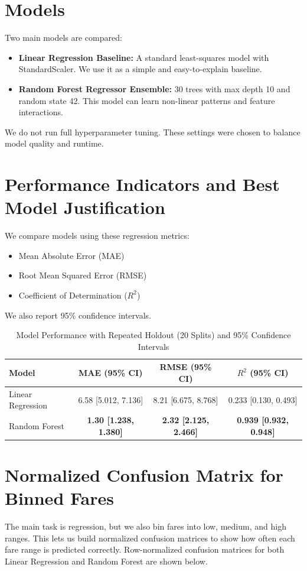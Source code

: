 \documentclass[conference]{IEEEtran}
\begin{document}
\section{Models}
Two main models are compared:
\begin{itemize}
\item \textbf{Linear Regression Baseline:} A standard least-squares model with StandardScaler.
          We use it as a simple and easy-to-explain baseline.
\item \textbf{Random Forest Regressor Ensemble:} 30 trees with max depth 10 and random state 42.
		  This model can learn non-linear patterns and feature interactions.
\end{itemize}
We do not run full hyperparameter tuning.
These settings were chosen to balance model quality and runtime.

\section{Performance Indicators and Best Model Justification}
We compare models using these regression metrics:
\begin{itemize}
	\item Mean Absolute Error (MAE)
	\item Root Mean Squared Error (RMSE)
	\item Coefficient of Determination ($R^2$)
\end{itemize}
We also report 95\% confidence intervals.

\begin{table}[htbp]
\caption{Model Performance with Repeated Holdout (20 Splits) and 95\% Confidence Intervals}
\label{tab:results}
\centering
\begin{tabular}{lccc}
\toprule
Model & MAE (95\% CI) & RMSE (95\% CI) & $R^2$ (95\% CI) \\
\midrule
Linear Regression & 6.58 [5.012, 7.136] & 8.21 [6.675, 8.768] & 0.233 [0.130, 0.493] \\
Random Forest & \textbf{1.30 [1.238, 1.380]} & \textbf{2.32 [2.125, 2.466]} & \textbf{0.939 [0.932, 0.948]} \\
\bottomrule
\end{tabular}
\end{table}

\section{Normalized Confusion Matrix for Binned Fares}
The main task is regression, but we also bin fares into low, medium, and high ranges.
This lets us build normalized confusion matrices to show how often each fare range is predicted correctly.
Row-normalized confusion matrices for both Linear Regression and Random Forest are shown below.
\end{document}
